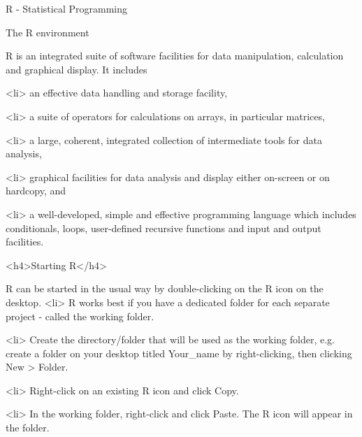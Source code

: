 



R - Statistical Programming 





The R environment


R is an integrated suite of software facilities for data manipulation, calculation and graphical display. It includes

<li>
an effective data handling and storage facility,

<li>
a suite of operators for calculations on arrays, in particular matrices,

<li>
a large, coherent, integrated collection of intermediate tools for data analysis,

<li>
graphical facilities for data analysis and display either on-screen or on hardcopy, and

<li>
a well-developed, simple and effective programming language which includes conditionals, loops, user-defined recursive functions and input and output facilities.




<h4>Starting R</h4>


R can be started in the usual way by double-clicking on the R icon on the desktop.
<li>
R works best if you have a dedicated folder for each separate project - called the working folder.

<li>
Create the directory/folder that will be used as the working folder, e.g. create a folder on your desktop titled Your_name by right-clicking, then clicking New > Folder.

<li>
Right-click on an existing R icon and click Copy.

<li>
In the working folder, right-click and click Paste. The R icon will appear in the folder.



